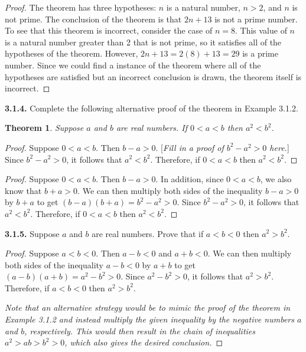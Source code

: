 \documentclass[12pt]{amsart}
\newenvironment{statement}[1]{\smallskip\noindent\color[rgb]{.6627, .3529, .6314} {\bf #1.}}{}
\newtheorem{theorem}{Theorem}
\theoremstyle{definition}
\theoremstyle{remark}
\begin{document}
\begin{proof}
The theorem has three hypotheses: $n$ is a natural number, $n > 2$, and $n$ is not prime.
The conclusion of the theorem is that $2n + 13$ is not a prime number.
To see that this theorem is incorrect, consider the case of $n = 8$.
This value of $n$ is a natural number greater than 2 that is not prime, 
so it satisfies all of the hypotheses of the theorem.
However, $2n + 13 = 2(8) + 13 = 29$ is a prime number.
Since we could find a instance of the theorem where all of the hypotheses are satisfied
but an incorrect conclusion is drawn, the theorem itself is incorrect.
\end{proof}


\begin{statement}{3.1.4}
Complete the following alternative proof of the theorem in Example 3.1.2.
\begin{theorem}
	Suppose $a$ and $b$ are real numbers.
	If $0 < a < b$ then $a^2 < b^2$.
\end{theorem}
\begin{proof}
	Suppose $0 < a < b$.
	Then $b - a > 0$.
	[\emph{Fill in a proof of $b^2 - a^2 > 0$ here.}]
	Since $b^2 - a^2 > 0$, it follows that $a^2 < b^2$.
	Therefore, if $0 < a < b$ then $a^2 < b^2$.
\end{proof}
\end{statement}

\begin{proof}
Suppose $0 < a < b$.
Then $b - a > 0$.
In addition, since $0 < a < b$, we also know that $b + a > 0$.
We can then multiply both sides of the inequality $b - a > 0$ by $b + a$
to get $(b - a)(b + a) = b^2 - a^2 > 0$.
Since $b^2 - a^2 > 0$, it follows that $a^2 < b^2$.
Therefore, if $0 < a < b$ then $a^2 < b^2$.
\end{proof}


\begin{statement}{3.1.5}
Suppose $a$ and $b$ are real numbers.
Prove that if $a < b < 0$ then $a^2 > b^2$.
\end{statement}

\begin{proof}
Suppose $a < b < 0$.
Then $a - b < 0$ and $a + b < 0$.
We can then multiply both sides of the inequality $a - b < 0$ by $a + b$
to get $(a - b)(a + b) = a^2 - b^2 > 0$.
Since $a^2 - b^2 > 0$, it follows that $a^2 > b^2$.
Therefore, if $a < b < 0$ then $a^2 > b^2$.

\emph{Note that an alternative strategy would be to mimic the proof of the theorem in Example 3.1.2 and instead multiply the given inequality by the negative numbers $a$ and $b$, respectively.
This would then result in the chain of inequalities $a^2 > ab > b^2 > 0$, which also gives the desired conclusion.}
\end{proof}
\end{document}
